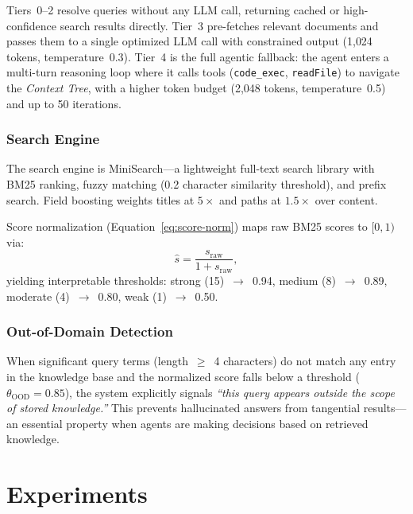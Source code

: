 \documentclass[11pt]{article}
\newcommand{\contexttree}{\textit{Context Tree}}
\begin{document}
Tiers~0--2 resolve queries without any LLM call, returning cached
or high-confidence search results directly.
Tier~3 pre-fetches relevant documents and passes them
to a single optimized LLM call with constrained output
(1{,}024 tokens, temperature~0.3).
Tier~4 is the full agentic fallback:
the agent enters a multi-turn reasoning loop
where it calls tools (\texttt{code\_exec}, \texttt{readFile})
to navigate the \contexttree{}, with a higher token budget
(2{,}048 tokens, temperature~0.5) and up to 50 iterations.

\subsubsection{Search Engine}

The search engine is MiniSearch---a lightweight full-text search library
with BM25 ranking, fuzzy matching (0.2 character similarity threshold),
and prefix search.
Field boosting weights titles at $5\times$ and paths at $1.5\times$ over content.

Score normalization (Equation~\ref{eq:score-norm}) maps raw BM25 scores to $[0, 1)$ via:
\begin{equation}
  \hat{s} = \frac{s_{\text{raw}}}{1 + s_{\text{raw}}},
  \label{eq:score-norm}
\end{equation}
yielding interpretable thresholds: strong (15)~$\to$~0.94, medium (8)~$\to$~0.89,
moderate (4)~$\to$~0.80, weak (1)~$\to$~0.50.

\subsubsection{Out-of-Domain Detection}

When significant query terms (length~$\geq$~4 characters) do not match
any entry in the knowledge base and the normalized score falls below
a threshold ($\theta_{\text{OOD}} = 0.85$), the system explicitly signals
\emph{``this query appears outside the scope of stored knowledge.''}
This prevents hallucinated answers from tangential results---an
essential property when agents are making decisions based on retrieved knowledge.



\section{Experiments}
\label{sec:experiments}
\end{document}
